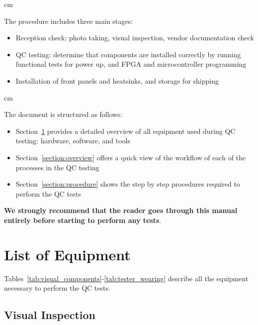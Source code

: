 \documentclass[a4paper,12pt]{article}
\begin{document}
 cm

The procedure includes three main stages: 

\begin{itemize}
    \item Reception check: photo taking, visual inspection, vendor documentation check
    \item QC testing: determine that components are installed correctly by running functional tests for power up, and FPGA and microcontroller programming
    \item Installation of front panels and heatsinks, and storage for shipping
\end{itemize}

 cm

The document is structured as follows:

\begin{itemize}
    \item Section~\ref{section:equipment} provides a detailed overview of all equipment used during QC testing: hardware, software, and tools
    
    \item Section~\ref{section:overview} offers a quick view of the workflow of each of the processes in the QC testing
    
    \item Section~\ref{section:procedure} shows the step by step procedures required to perform the QC tests
    
\end{itemize}



\vskip 1cm

\textbf{We strongly recommend that the reader goes through this manual entirely before starting to perform any tests}.



\clearpage

\section{List of Equipment}
\label{section:equipment}

Tables~\ref{tab:visual_components}-\ref{tab:tester_wearing} describe all the equipment necessary to perform the QC tests. 

\subsection{Visual Inspection}
\end{document}
